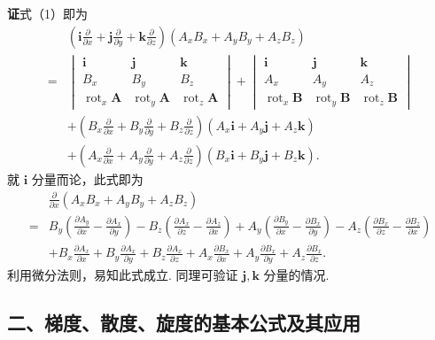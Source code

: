 \documentclass[UTF8,12pt,a4paper,fontset=fandol]{ctexart}
\begin{document}
\noindent\textbf{证}\quad 式（1）即为
\[
\begin{aligned}
&\left(\mathbf i\frac{\partial}{\partial x}+\mathbf j\frac{\partial}{\partial y}+\mathbf k\frac{\partial}{\partial z}\right)
(A_xB_x+A_yB_y+A_zB_z)\\
={}&
\begin{vmatrix}
\mathbf i & \mathbf j & \mathbf k\\
B_x & B_y & B_z\\
\operatorname{rot}_x\mathbf A & \operatorname{rot}_y\mathbf A & \operatorname{rot}_z\mathbf A
\end{vmatrix}
+
\begin{vmatrix}
\mathbf i & \mathbf j & \mathbf k\\
A_x & A_y & A_z\\
\operatorname{rot}_x\mathbf B & \operatorname{rot}_y\mathbf B & \operatorname{rot}_z\mathbf B
\end{vmatrix}\\
&+\left(B_x\frac{\partial}{\partial x}+B_y\frac{\partial}{\partial y}+B_z\frac{\partial}{\partial z}\right)(A_x\mathbf i+A_y\mathbf j+A_z\mathbf k)\\
&+\left(A_x\frac{\partial}{\partial x}+A_y\frac{\partial}{\partial y}+A_z\frac{\partial}{\partial z}\right)(B_x\mathbf i+B_y\mathbf j+B_z\mathbf k).
\end{aligned}
\]
就 $\mathbf i$ 分量而论，此式即为
\[
\begin{aligned}
&\frac{\partial}{\partial x}(A_xB_x+A_yB_y+A_zB_z)\\
={}&B_y\left(\frac{\partial A_y}{\partial x}-\frac{\partial A_x}{\partial y}\right)
-B_z\left(\frac{\partial A_x}{\partial z}-\frac{\partial A_z}{\partial x}\right)
+A_y\left(\frac{\partial B_y}{\partial x}-\frac{\partial B_x}{\partial y}\right)
-A_z\left(\frac{\partial B_x}{\partial z}-\frac{\partial B_z}{\partial x}\right)\\
&+B_x\frac{\partial A_x}{\partial x}
+B_y\frac{\partial A_x}{\partial y}
+B_z\frac{\partial A_x}{\partial z}
+A_x\frac{\partial B_x}{\partial x}
+A_y\frac{\partial B_x}{\partial y}
+A_z\frac{\partial B_x}{\partial z}.
\end{aligned}
\]
利用微分法则，易知此式成立. 同理可验证 $\mathbf j,\mathbf k$ 分量的情况.

\subsection*{二、梯度、散度、旋度的基本公式及其应用}
\end{document}
